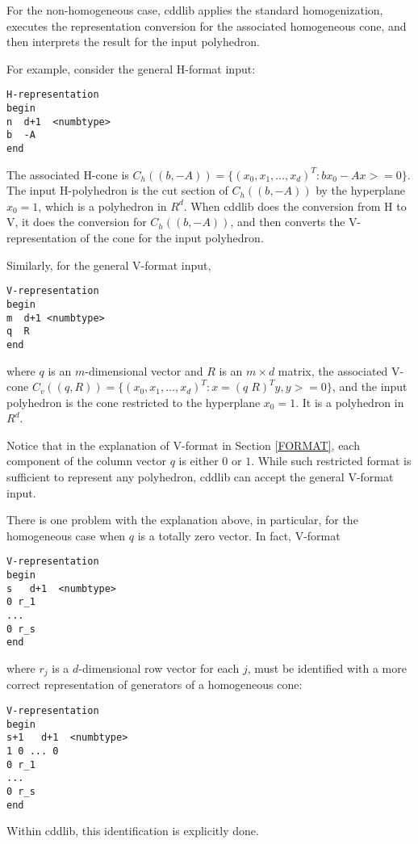 \documentclass[11pt]{article}
\newcommand {\0} {{\bf 0}}
\begin{document}
For the non-homogeneous case, cddlib applies the standard homogenization,
executes the representation conversion for the associated homogeneous cone,
and then interprets the result for the input polyhedron.

For example, consider the general H-format input:
\begin{verbatim}
H-representation
begin
n  d+1  <numbtype>
b  -A
end
\end{verbatim}
The associated H-cone is $C_h((b, -\!A)) = \{ (x_0, x_1, \ldots, x_d)^T:  b x_0 - A x >=0 \}$.
The input H-polyhedron is the cut section of $C_h((b, -\!A))$ by 
the hyperplane $x_0 =1$, which is a polyhedron in $R^d$.  When cddlib does
the conversion from H to V, it does the conversion for $C_h((b, -\!A))$,
and then converts the V-representation of the cone for the input polyhedron.

Similarly, for the general V-format input, 
\begin{verbatim}
V-representation
begin
m  d+1 <numbtype>
q  R
end
\end{verbatim}
where $q$ is an $m$-dimensional vector and $R$ is an $m \times d$ matrix,
the associated V-cone $C_v((q, R)) = \{ (x_0, x_1, \ldots, x_d)^T:  x = (q \; R)^T y,  y >=0 \}$,
and the input polyhedron is the cone 
restricted to the hyperplane $x_0 =1$.  It is a polyhedron in $R^d$.

Notice that in the explanation of V-format in Section \ref{FORMAT}, each component of 
the column vector $q$ is either $0$ or $1$.  While such restricted format is sufficient to
represent any polyhedron, cddlib can accept the general V-format input.

There is one problem with the explanation above, in particular,
for the homogeneous case when $q$ is a totally zero vector.  In fact, V-format
\begin{verbatim}
V-representation
begin
s   d+1  <numbtype>
0 r_1
...
0 r_s
end
\end{verbatim}
where $r_j$ is a $d$-dimensional row vector for each $j$,
must be identified with a more correct
representation of generators of a homogeneous cone:
\begin{verbatim}
V-representation
begin
s+1   d+1  <numbtype>
1 0 ... 0
0 r_1
...
0 r_s
end
\end{verbatim}
Within cddlib, this identification is explicitly done.
\end{document}
